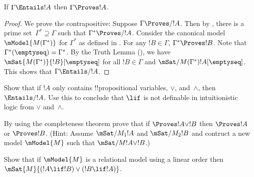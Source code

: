 \documentclass[../../../include/open-logic-section]{subfiles}
\begin{document}


\begin{thm}
  If $\Gamma \Entails !A$ then $\Gamma \Proves !A$.
\end{thm}

\begin{proof}
  We prove the contrapositive: Suppose $\Gamma \Proves/ !A$. Then by
  , there is a prime set~$\Gamma^*
  \supseteq \Gamma$ such that $\Gamma^* \Proves/ !A$. Consider the
  canonical model~$\mModel{M(\Gamma^*)}$ for $\Gamma^*$ as defined in
  . For any $!B \in \Gamma$, $\Gamma^*
  \Proves !B$. Note that $\Gamma^*(\emptyseq) = \Gamma^*$. By the Truth
  Lemma (), we have
  $\mSat{M(\Gamma^*)}{!B}[\emptyseq]$ for all $!B \in \Gamma$ and
  $\mSat/{M(\Gamma^*)}{!A}[\emptyseq]$. This shows that $\Gamma
  \Entails/ !A$.
\end{proof}

\begin{prob}
  Show that if $!A$ only contains !!{propositional variable}s, $\lor$,
  and~$\land$, then $\Entails/ !A$. Use this to conclude that $\lif$ is
  not definable in intuitionistic logic from $\lor$ and~$\land$. 
\end{prob}
  
\begin{prob}
  By using the completeness theorem prove that if $\Proves !A \lor !B$ then
  $\Proves !A$ or $\Proves !B$. (Hint: Assume $\mSat/{M_1}{!A}$ and
  $\mSat/{M_2}{!B}$ and contruct a new model $\mModel{M}$ such that
  $\mSat/{M}{!A \lor !B}$.)
\end{prob}
  
\begin{prob} 
  Show that if $\mModel{M}$ is a relational model using a linear order then
  $\mSat{M}{(!A \lif !B)\lor(!B \lif !A)}$.
\end{prob}
\end{document}
